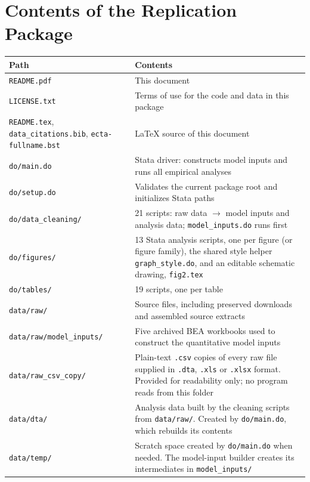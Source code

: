 \documentclass[11pt]{article}
\newcommand{\pkgfile}[1]{\nolinkurl{#1}}
\begin{document}
\section{Contents of the Replication Package}

\begin{longtable}{@{}p{5.4cm}p{9.4cm}@{}}
\toprule
\textbf{Path} & \textbf{Contents}\\
\midrule
\endhead
\pkgfile{README.pdf} & This document\\
\pkgfile{LICENSE.txt} & Terms of use for the code and data in this package\\
\pkgfile{README.tex}, \pkgfile{data_citations.bib}, \pkgfile{ecta-fullname.bst} & \LaTeX{} source of this document\\
\pkgfile{do/main.do} & Stata driver: constructs model inputs and runs all empirical analyses\\
\pkgfile{do/setup.do} & Validates the current package root and initializes Stata paths\\
\pkgfile{do/data_cleaning/} & 21 scripts: raw data $\rightarrow$ model inputs and analysis data; \pkgfile{model_inputs.do} runs first\\
\pkgfile{do/figures/} & 13 Stata analysis scripts, one per figure (or figure family), the shared style helper \pkgfile{graph_style.do}, and an editable schematic drawing, \pkgfile{fig2.tex}\\
\pkgfile{do/tables/} & 19 scripts, one per table\\
\pkgfile{data/raw/} & Source files, including preserved downloads and assembled source extracts\\
\pkgfile{data/raw/model_inputs/} & Five archived BEA workbooks used to construct the quantitative model inputs\\
\pkgfile{data/raw_csv_copy/} & Plain-text \texttt{.csv} copies of every raw file supplied in \texttt{.dta}, \texttt{.xls} or \texttt{.xlsx} format. Provided for readability only; no program reads from this folder\\
\pkgfile{data/dta/} & Analysis data built by the cleaning scripts from \pkgfile{data/raw/}. Created by \pkgfile{do/main.do}, which rebuilds its contents\\
\pkgfile{data/temp/} & Scratch space created by \pkgfile{do/main.do} when needed. The model-input builder creates its intermediates in \pkgfile{model_inputs/}\\

\end{longtable}
\end{document}
